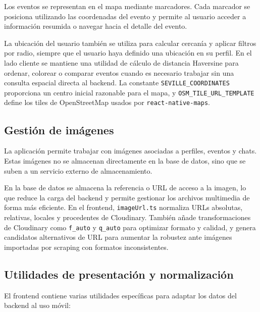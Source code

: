Los eventos se representan en el mapa mediante marcadores. Cada marcador se posiciona utilizando las coordenadas del evento y permite al usuario acceder a información resumida o navegar hacia el detalle del evento.

La ubicación del usuario también se utiliza para calcular cercanía y aplicar filtros por radio, siempre que el usuario haya definido una ubicación en su perfil. En el lado cliente se mantiene una utilidad de cálculo de distancia Haversine para ordenar, colorear o comparar eventos cuando es necesario trabajar sin una consulta espacial directa al backend. La constante \texttt{SEVILLE\_COORDINATES} proporciona un centro inicial razonable para el mapa, y \texttt{OSM\_TILE\_URL\_TEMPLATE} define los tiles de OpenStreetMap usados por \texttt{react-native-maps}.

\subsection{Gestión de imágenes}

La aplicación permite trabajar con imágenes asociadas a perfiles, eventos y chats. Estas imágenes no se almacenan directamente en la base de datos, sino que se suben a un servicio externo de almacenamiento.

En la base de datos se almacena la referencia o URL de acceso a la imagen, lo que reduce la carga del backend y permite gestionar los archivos multimedia de forma más eficiente. En el frontend, \texttt{imageUrl.ts} normaliza URLs absolutas, relativas, locales y procedentes de Cloudinary. También añade transformaciones de Cloudinary como \texttt{f\_auto} y \texttt{q\_auto} para optimizar formato y calidad, y genera candidatos alternativos de URL para aumentar la robustez ante imágenes importadas por scraping con formatos inconsistentes.

\subsection{Utilidades de presentación y normalización}

El frontend contiene varias utilidades específicas para adaptar los datos del backend al uso móvil:

